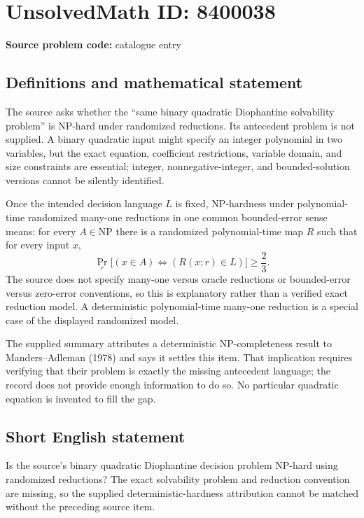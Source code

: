 \documentclass[11pt]{article}
\begin{document}
\section*{UnsolvedMath ID: 8400038}
\textbf{Source problem code:} catalogue entry
\subsection{Definitions and mathematical statement}
The source asks whether the ``same binary quadratic Diophantine solvability problem'' is NP-hard under randomized reductions. Its antecedent problem is not supplied. A binary quadratic input might specify an integer polynomial in two variables, but the exact equation, coefficient restrictions, variable domain, and size constraints are essential; integer, nonnegative-integer, and bounded-solution versions cannot be silently identified.

Once the intended decision language $L$ is fixed, NP-hardness under polynomial-time randomized many-one reductions in one common bounded-error sense means: for every $A\in\mathrm{NP}$ there is a randomized polynomial-time map $R$ such that for every input $x$,
\[
\Pr_r\bigl[(x\in A)\Longleftrightarrow(R(x;r)\in L)\bigr]\geq\frac23.
\]
The source does not specify many-one versus oracle reductions or bounded-error versus zero-error conventions, so this is explanatory rather than a verified exact reduction model. A deterministic polynomial-time many-one reduction is a special case of the displayed randomized model.

The supplied summary attributes a deterministic NP-completeness result to Manders--Adleman (1978) and says it settles this item. That implication requires verifying that their problem is exactly the missing antecedent language; the record does not provide enough information to do so. No particular quadratic equation is invented to fill the gap.
\subsection{Short English statement}
Is the source's binary quadratic Diophantine decision problem NP-hard using randomized reductions? The exact solvability problem and reduction convention are missing, so the supplied deterministic-hardness attribution cannot be matched without the preceding source item.
\end{document}
